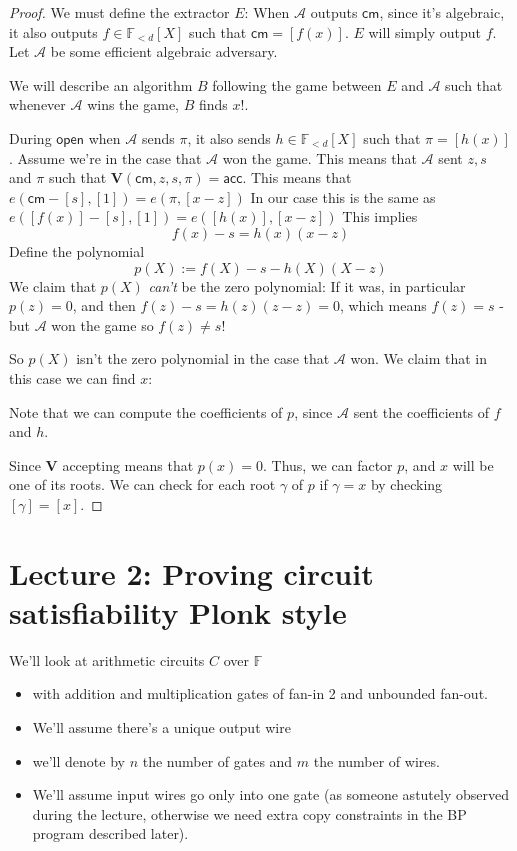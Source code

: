 \documentclass[11pt]{article} %
\newcommand{\F}{\ensuremath{\mathbb F}\xspace}
\newcommand{\adv}{\ensuremath{\mathcal A}\xspace}
\newcommand{\cm}{\ensuremath{\mathsf{cm}}\xspace}
\newcommand{\open}{\ensuremath{\mathsf{open}}\xspace}
\newcommand{\acc}{\ensuremath{\mathsf{acc}}\xspace}
\newcommand{\defeq}{:=}
\newcommand{\enc}[1]{\ensuremath{\left[#1\right]}\xspace}
\newcommand{\prf}{\ensuremath{\pi}\xspace}
\newcommand{\ver}{\ensuremath{\mathsf{\mathbf{V}}}\xspace}
\newcommand{\ext}{\ensuremath{E}\xspace}
\newcommand{\polysofdeg}[1]{\ensuremath{\F_{< #1}[X]}\xspace}
\begin{document}
\begin{proof}
 We must define the extractor \ext:
 When \adv outputs \cm, since it's algebraic, it also outputs  $f\in\polysofdeg{d}$ such that
 $\cm = \enc{f(x)}$.
 \ext will simply output $f$.
 Let \adv be some efficient algebraic adversary.
 
 We will describe an algorithm $B$ following the game between \ext and \adv such that
 whenever \adv wins the game, $B$ finds $x$!.
 
 
 During \open when \adv sends \prf, it also sends 
 $h\in \polysofdeg{d}$ such that $\prf=\enc{h(x)}$.
 Assume we're in the case that \adv won the game.
 This means that \adv sent $z,s$  and $\prf$ such that
 $\ver(\cm,z,s,\prf) =\acc$.
 This means that
 $e(\cm-[s],[1]) = e(\prf,[x-z])$
 In our case this is the same as
 $e(\enc{f(x)}-[s],[1]) = e(\enc{h(x)},[x-z])$
 This implies
 \[f(x)-s = h(x)(x-z)\]
 Define the polynomial 
 \[p(X)\defeq f(X)-s - h(X)(X-z)\]
 We claim that $p(X)$ \emph{can't} be the zero polynomial:
 If it was, in particular $p(z)=0$, and then
 $f(z)-s =  h(z)(z-z)=0$, which means $f(z)=s$ - but \adv won the game so $f(z)\neq s$!
 
 So $p(X)$ isn't the zero polynomial in the case that \adv won.
 We claim that in this case we can find $x$:
 
 Note that we can compute the coefficients of $p$, since \adv sent the coefficients of $f$ and $h$.
 
 Since \ver accepting means that $p(x)=0$.
Thus, we can factor $p$, and $x$ will be one of its roots.
We can check for each root $\gamma$ of $p$ if $\gamma=x$ by checking $\enc{\gamma}=\enc{x}$.


 
 
\end{proof}

\section{Lecture 2: Proving circuit satisfiability Plonk style}

We'll look at arithmetic circuits $C$ over \F
\begin{itemize}
 \item with addition and multiplication gates of fan-in 2 and unbounded fan-out.
\item We'll assume there's a unique output wire
\item we'll denote by $n$ the number of gates and $m$ the number of wires.
\item We'll assume input wires go only into one gate (as someone astutely observed during the lecture, otherwise we need extra copy constraints in the BP program described later).
\end{itemize}
\end{document}
